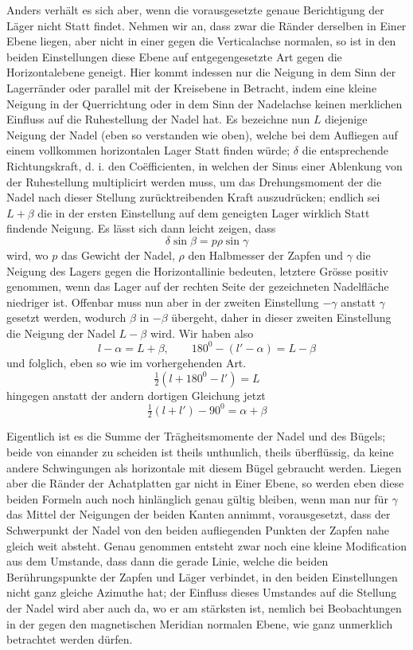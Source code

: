 Anders verhält es sich aber, wenn die vorausgesetzte genaue Berichtigung der Läger nicht Statt findet. Nehmen wir an, dass zwar die Ränder derselben in Einer Ebene liegen, aber nicht in einer gegen die Verticalachse normalen, so ist in den beiden Einstellungen diese Ebene auf entgegengesetzte Art gegen die Horizontalebene geneigt. Hier kommt indessen nur die Neigung in dem Sinn der Lagerränder oder parallel mit der Kreisebene in Betracht, indem eine kleine Neigung in der Querrichtung oder in dem Sinn der Nadelachse keinen merklichen Einfluss auf die Ruhestellung der Nadel hat. Es bezeichne nun $L$ diejenige Neigung der Nadel (eben so verstanden wie oben), welche bei dem Aufliegen auf einem vollkommen horizontalen Lager Statt finden würde; $\delta$ die entsprechende Richtungskraft, d. i. den Coëfficienten, in welchen der Sinus einer Ablenkung von der Ruhestellung multiplicirt werden muss, um das Drehungsmoment der die Nadel nach dieser Stellung zurücktreibenden Kraft auszudrücken; endlich sei $L+\beta$ die in der ersten Einstellung auf dem geneigten Lager wirklich Statt findende Neigung. Es lässt sich dann leicht zeigen, dass
\[
\delta\sin\beta=p\rho\sin\gamma
\]
wird, wo $p$ das Gewicht der Nadel, $\rho$ den Halbmesser der Zapfen und $\gamma$ die Neigung des Lagers gegen die Horizontallinie bedeuten, letztere Grösse positiv genommen, wenn das Lager auf der rechten Seite der gezeichneten Nadelfläche niedriger ist. Offenbar muss nun aber in der zweiten Einstellung $-\gamma$ anstatt $\gamma$ gesetzt werden, wodurch $\beta$ in $-\beta$ übergeht, daher in dieser zweiten Einstellung die Neigung der Nadel $L-\beta$ wird. Wir haben also
\[
l-\alpha=L+\beta,\qquad180^0-(l'-\alpha)=L-\beta
\]
und folglich, eben so wie im vorhergehenden Art.
\[
\tfrac{1}{2}(l+180^0-l')=L
\]
hingegen anstatt der andern dortigen Gleichung jetzt
\[
\tfrac{1}{2}(l+l')-90^0=\alpha+\beta
\]


\expandafter\def\csname HistoricalNoteText465\endcsname{Eigentlich ist es die Summe der Trägheitsmomente der Nadel und des Bügels; beide von einander zu scheiden ist theils unthunlich, theils überflüssig, da keine andere Schwingungen als horizontale mit diesem Bügel gebraucht werden.}
Liegen aber die Ränder der Achatplatten gar nicht in Einer Ebene, so werden eben diese beiden Formeln auch noch hinlänglich genau gültig bleiben, wenn man nur für $\gamma$ das Mittel der Neigungen der beiden Kanten annimmt, vorausgesetzt, dass der Schwerpunkt der Nadel von den beiden aufliegenden Punkten der Zapfen nahe gleich weit absteht. Genau genommen entsteht zwar noch eine kleine Modification aus dem Umstande, dass dann die gerade Linie, welche die beiden Berührungspunkte der Zapfen und Läger verbindet, in den beiden Einstellungen nicht ganz gleiche Azimuthe hat; der Einfluss dieses Umstandes auf die Stellung der Nadel wird aber auch da, wo er am stärksten ist, nemlich bei Beobachtungen in der gegen den magnetischen Meridian normalen Ebene, wie ganz unmerklich betrachtet werden dürfen.

